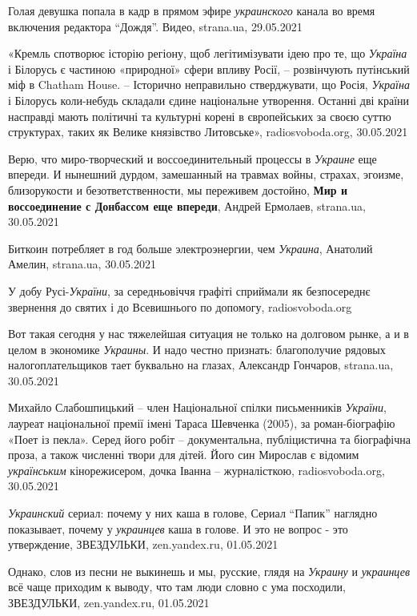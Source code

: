 Голая девушка попала в кадр в прямом эфире \emph{украинского} канала во время
включения редактора \enquote{Дождя}. Видео, strana.ua, 29.05.2021

«Кремль спотворює історію регіону, щоб легітимізувати ідею про те, що
\emph{Україна} і Білорусь є частиною «природної» сфери впливу Росії, –
розвінчують путінський міф в Chatham House. – Історично неправильно
стверджувати, що Росія, \emph{Україна} і Білорусь коли-небудь складали єдине
національне утворення. Останні дві країни насправді мають політичні та
культурні корені в європейських за своєю суттю структурах, таких як Велике
князівство Литовське», radiosvoboda.org, 30.05.2021

Верю, что миро-творческий и воссоединительный процессы в \emph{Украине} еще
впереди. И нынешний дурдом, замешанный на травмах войны, страхах, эгоизме,
близорукости и безответственности, мы переживем достойно, \textbf{Мир и
воссоединение с Донбассом еще впереди}, Андрей Ермолаев, strana.ua, 30.05.2021

Биткоин потребляет в год больше электроэнергии, чем \emph{Украина}, Анатолий
Амелин, strana.ua, 30.05.2021

У добу Русі-\emph{України}, за середньовіччя графіті сприймали як безпосереднє
звернення до святих і до Всевишнього по допомогу, radiosvoboda.org

Вот такая сегодня у нас тяжелейшая ситуация не только на долговом рынке, а и в
целом в экономике \emph{Украины}. И надо честно признать: благополучие рядовых
налогоплательщиков тает буквально на глазах, Александр Гончаров, strana.ua,
30.05.2021

Михайло Слабошпицький – член Національної спілки письменників \emph{України},
лауреат національної премії імені Тараса Шевченка (2005), за роман-біографію
«Поет із пекла». Серед його робіт – документальна, публіцистична та біографічна
проза, а також численні твори для дітей. Його син Мирослав є відомим
\emph{українським} кінорежисером, дочка Іванна – журналісткою,
radiosvoboda.org, 30.05.2021

\emph{Украинский} сериал: почему у них каша в голове, Сериал \enquote{Папик}
наглядно показывает, почему у \emph{украинцев} каша в голове. И это не вопрос -
это утверждение, ЗВЕЗДУЛЬКИ, zen.yandex.ru, 01.05.2021

Однако, слов из песни не выкинешь и мы, русские, глядя на \emph{Украину} и
\emph{украинцев} всё чаще приходим к выводу, что там люди словно с ума
посходили, ЗВЕЗДУЛЬКИ, zen.yandex.ru, 01.05.2021

